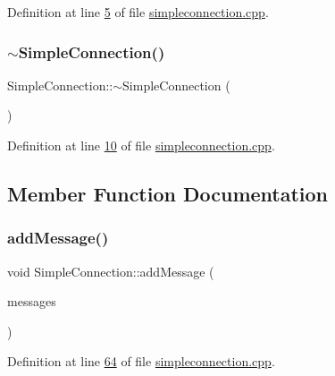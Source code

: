 Definition at line \hyperlink{a00005_source_l00005}{5} of file \hyperlink{a00005_source}{simpleconnection.\+cpp}.

\mbox{\label{a00125_a61b33627900c86ffa7f7936acae2873a}} 
\subsubsection{\texorpdfstring{$\sim$\+Simple\+Connection()}{~SimpleConnection()}}
{\footnotesize\ttfamily Simple\+Connection\+::$\sim$\+Simple\+Connection (\begin{DoxyParamCaption}{ }\end{DoxyParamCaption})\hspace{0.3cm}{\ttfamily [virtual]}}



Definition at line \hyperlink{a00005_source_l00010}{10} of file \hyperlink{a00005_source}{simpleconnection.\+cpp}.



\subsection{Member Function Documentation}
\mbox{\label{a00125_a0e40869759ba98f1964257d9c507b733}} 
\subsubsection{\texorpdfstring{add\+Message()}{addMessage()}}
{\footnotesize\ttfamily void Simple\+Connection\+::add\+Message (\begin{DoxyParamCaption}\item[{\hyperlink{a00129}{Message\+Builder} $\ast$}]{messages }\end{DoxyParamCaption})\hspace{0.3cm}{\ttfamily [protected]}}



Definition at line \hyperlink{a00005_source_l00064}{64} of file \hyperlink{a00005_source}{simpleconnection.\+cpp}.


